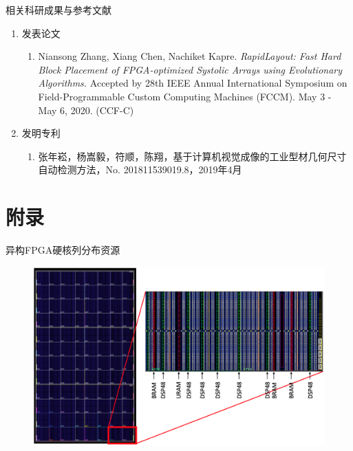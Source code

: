 \documentclass[10pt]{beamer}
\begin{document}
\begin{frame}{相关科研成果与参考文献}
\begin{enumerate}
	\item 发表论文
	\begin{enumerate}
		\item Niansong Zhang, Xiang Chen, Nachiket Kapre.
		 \textit{RapidLayout: Fast Hard Block Placement of FPGA-optimized Systolic Arrays using Evolutionary Algorithms.}
		 Accepted by 28th IEEE Annual International Symposium on Field-Programmable Custom Computing Machines (FCCM). 
		 May 3 - May 6, 2020. (CCF-C)
	\end{enumerate}
	\item 发明专利
	\begin{enumerate}
		\item 张年崧，杨嵩毅，符顺，陈翔，基于计算机视觉成像的工业型材几何尺寸自动检测方法，No. 201811539019.8，2019年4月
	\end{enumerate}
	
\end{enumerate}

\end{frame}

%   
%   

\section{附录}

\begin{frame}{异构FPGA硬核列分布资源}
  \begin{figure}
    \includegraphics[width=\textwidth]{img/architecture.png}
  \end{figure}
\end{frame}
\end{document}
